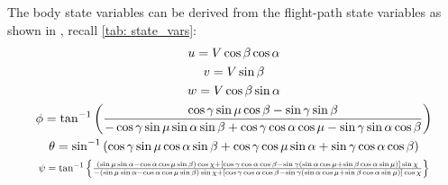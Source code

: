 \documentclass[12pt]{ucthesis}
\begin{document}
The body state variables can be derived from the flight-path state variables as shown in \citet{WL-TR-96-3099}, recall \autoref{tab: state_vars}:
%
	\begin{gather}
		u		= V\cos\beta\cos\alpha \label{eq: body_u} \\
		v		= V\sin\beta \label{eq: body_v} \\
		w		= V\cos\beta\sin\alpha \label{eq: body_w} \\
		\phi	= \tan^{-1} \left( \frac{\cos\gamma\sin\mu\cos\beta-\sin\gamma\sin\beta}{-\cos\gamma\sin\mu\sin\alpha\sin\beta+\cos\gamma\cos\alpha\cos\mu-\sin\gamma \sin\alpha\cos\beta} \right) \label{eq: body_phi} \\
		\theta	= \sin^{-1} \left( \cos\gamma\sin\mu\cos\alpha\sin\beta+\cos\gamma\cos\mu \sin\alpha+\sin\gamma\cos\alpha\cos\beta \right) \label{eq: body_theta} \\
		\resizebox{.9\hsize}{!}{$
		\psi 	= \tan^{-1} \left\lbrace \frac{ \left( \sin\mu \sin\alpha - \cos\alpha \cos\mu \sin\beta \right) \cos\chi + \left[ \cos\gamma \cos\alpha \cos\beta -\sin\gamma \left( \sin\alpha \cos\mu +\sin\beta \cos\alpha \sin\mu \right) \right] \sin\chi}{- \left( \sin\mu \sin\alpha - \cos\alpha \cos\mu \sin\beta \right) \sin\chi + \left[ \cos\gamma \cos\alpha \cos\beta - \sin\gamma \left(\sin\alpha \cos\mu + \sin\beta \cos\alpha \sin\mu \right) \right] \cos\chi} \right\rbrace$} \label{eq: body_psi}
	\end{gather}
\end{document}

